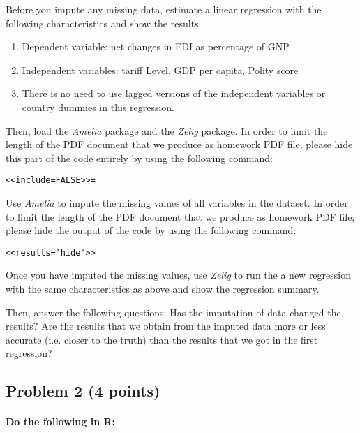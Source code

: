 \documentclass[12pt]{article}
\begin{document}
\bigskip

Before you impute any missing data, estimate a linear regression with the following characteristics and show the results:

\begin{enumerate}
	\item Dependent variable: net changes in FDI as percentage of GNP
	\item Independent variables: tariff Level, GDP per capita, Polity score
	\item There is no need to use lagged versions of the independent variables or country dummies in this regression.
\end{enumerate}

\bigskip

Then, load the \textit{Amelia} package and the \textit{Zelig} package. In order to limit the length of the PDF document that we produce as homework PDF file, please hide this part of the code entirely by using the following command:
\begin{verbatim}
<<include=FALSE>>=
\end{verbatim}

Use \textit{Amelia} to impute the missing values of all variables in the dataset. In order to limit the length of the PDF document that we produce as homework PDF file, please hide the output of the code by using the following command:
\begin{verbatim}
<<results='hide'>>
\end{verbatim}

Once you have imputed the missing values, use \textit{Zelig} to run the a new regression with the same characteristics as above and show the regression summary.

Then, answer the following questions: Has the imputation of data changed the results? Are the results that we obtain from the imputed data more or less accurate (i.e. closer to the truth) than the results that we got in the first regression?



\subsection*{Problem 2 (4 points)}

\paragraph{Do the following in R:}
\end{document}
